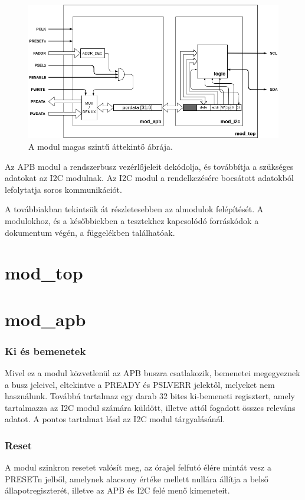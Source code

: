 \begin{figure}[ht!]
    \includegraphics[width=\textwidth]{figures/overview}
    \caption{A modul magas szintű áttekintő ábrája.}
    \label{fig:modtop}
\end{figure}

Az APB modul a rendszerbusz vezérlőjeleit dekódolja, és továbbítja a szükséges adatokat az I2C modulnak.
Az I2C modul a rendelkezésére bocsátott adatokból lefolytatja soros kommunikációt.

A továbbiakban tekintsük át részletesebben az almodulok felépítését. A modulokhoz, és a későbbiekben a tesztekhez kapcsolódó forráskódok a dokumentum végén, a függelékben találhatóak.

\section{mod\_top}

\section{mod\_apb}
\subsubsection{Ki és bemenetek}
Mivel ez a modul közvetlenül az APB buszra csatlakozik, bemenetei megegyeznek a busz jeleivel, eltekintve a PREADY és PSLVERR jelektől, melyeket nem használunk. Továbbá tartalmaz egy darab 32 bites ki-bemeneti regisztert, amely tartalmazza az I2C modul számára küldött, illetve attól fogadott összes releváns adatot. A pontos tartalmat lásd az I2C modul tárgyalásánál.

\subsubsection{Reset}
    A modul szinkron resetet valósít meg, az órajel felfutó élére mintát vesz a PRESETn jelből, amelynek alacsony értéke mellett nullára állítja a belső állapotregiszterét, illetve az APB és I2C felé menő kimeneteit.

